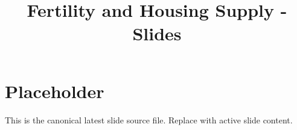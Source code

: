 \documentclass[11pt]{article}
\title{Fertility and Housing Supply - Slides}
\author{}
\date{}
\begin{document}
\maketitle

\section*{Placeholder}
This is the canonical latest slide source file. Replace with active slide content.
\end{document}
